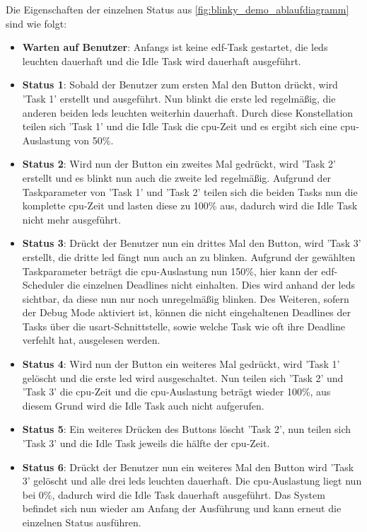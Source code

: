 \documentclass[../EDF Master Thesis.tex]{subfiles}
\begin{document}
        Die Eigenschaften der einzelnen Status aus \autoref{fig:blinky_demo_ablaufdiagramm} sind wie folgt:
        \begin{itemize}
            \item \textbf{Warten auf Benutzer}: Anfangs ist keine \ac{edf}-Task gestartet, die \ac{led}s leuchten dauerhaft und die Idle Task wird dauerhaft ausgeführt.
            \item \textbf{Status 1}: Sobald der Benutzer zum ersten Mal den Button drückt, wird 'Task 1' erstellt und ausgeführt.
                Nun blinkt die erste \ac{led} regelmäßig, die anderen beiden \ac{led}s leuchten weiterhin dauerhaft.
                Durch diese Konstellation teilen sich 'Task 1' und die Idle Task die \ac{cpu}-Zeit und es ergibt sich eine \ac{cpu}-Auslastung von 50\%.
            \item \textbf{Status 2}: Wird nun der Button ein zweites Mal gedrückt, wird 'Task 2' erstellt und es blinkt nun auch die zweite \ac{led} regelmäßig.
                Aufgrund der Taskparameter von 'Task 1' und 'Task 2' teilen sich die beiden Tasks nun die komplette \ac{cpu}-Zeit und lasten diese zu 100\% aus, dadurch wird die Idle Task nicht mehr ausgeführt.
            \item \textbf{Status 3}: Drückt der Benutzer nun ein drittes Mal den Button, wird 'Task 3' erstellt, die dritte \ac{led} fängt nun auch an zu blinken.
                Aufgrund der gewählten Taskparameter beträgt die \ac{cpu}-Auslastung nun 150\%, hier kann der \ac{edf}-Scheduler die einzelnen Deadlines nicht einhalten.
                Dies wird anhand der \ac{led}s sichtbar, da diese nun nur noch unregelmäßig blinken.
                Des Weiteren, sofern der Debug Mode aktiviert ist, können die nicht eingehaltenen Deadlines der Tasks über die \ac{usart}-Schnittstelle, sowie welche Task wie oft ihre Deadline verfehlt hat, ausgelesen werden.
            \item \textbf{Status 4}: Wird nun der Button ein weiteres Mal gedrückt, wird 'Task 1' gelöscht und die erste \ac{led} wird ausgeschaltet.
                Nun teilen sich 'Task 2' und 'Task 3' die \ac{cpu}-Zeit und die \ac{cpu}-Auslastung beträgt wieder 100\%, aus diesem Grund wird die Idle Task auch nicht aufgerufen.
            \item \textbf{Status 5}: Ein weiteres Drücken des Buttons löscht 'Task 2', nun teilen sich 'Task 3' und die Idle Task jeweils die hälfte der \ac{cpu}-Zeit.
            \item \textbf{Status 6}: Drückt der Benutzer nun ein weiteres Mal den Button wird 'Task 3' gelöscht und alle drei \ac{led}s leuchten dauerhaft.
                Die \ac{cpu}-Auslastung liegt nun bei 0\%, dadurch wird die Idle Task dauerhaft ausgeführt.
                Das System befindet sich nun wieder am Anfang der Ausführung und kann erneut die einzelnen Status ausführen.
        \end{itemize}
\end{document}
